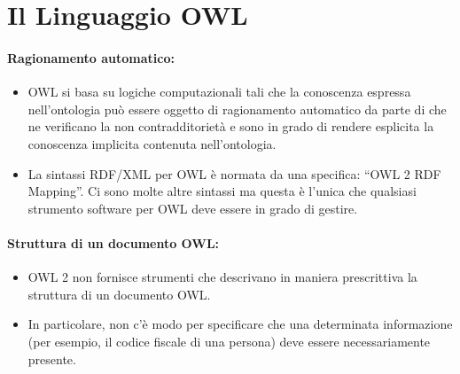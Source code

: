 \section{Il Linguaggio OWL}



\paragraph{Ragionamento automatico:}

\begin{itemize}
  \item OWL si basa su logiche computazionali tali che la
conoscenza espressa nell’ontologia può essere oggetto
di ragionamento automatico da parte di  che ne verificano la non
contradditorietà e sono in grado di rendere esplicita la
conoscenza implicita contenuta nell’ontologia.
\item La sintassi RDF/XML per OWL è normata da una
specifica: “OWL 2 RDF Mapping”. Ci sono molte altre
sintassi ma questa è l’unica che qualsiasi strumento
software per OWL deve essere in grado di gestire.
\end{itemize}

\paragraph{Struttura di un documento OWL:}

\begin{itemize}
  \item OWL 2 non fornisce strumenti che descrivano
in maniera prescrittiva la struttura di un
documento OWL. 
\item In particolare, non c’è modo per specificare
che una determinata informazione (per
esempio, il codice fiscale di una persona) deve
essere necessariamente presente.
\end{itemize}

